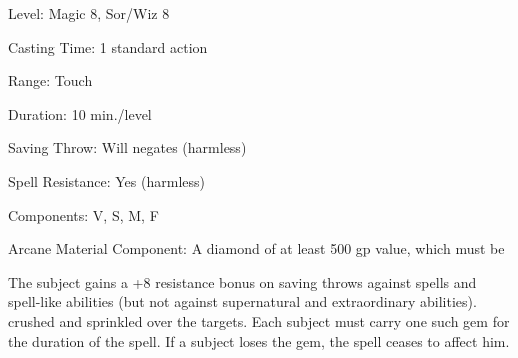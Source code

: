 
\begin{description*}
\item[Level:] Magic 8, Sor/Wiz 8
\item[Casting Time:] 1 standard action
\item[Range:] Touch
\item[Duration:] 10 min./level
\item[Saving Throw:] Will negates (harmless)
\item[Spell Resistance:] Yes (harmless)
\item[Components:] V, S, M, F
\item[Arcane Material Component:] A diamond of at least 500 gp value, which must be
\end{description*}

The subject gains a +8 resistance bonus on saving throws against spells and spell-like
abilities (but not against supernatural and extraordinary abilities).
crushed and sprinkled over the targets.
Each subject must carry one such gem for the duration of the spell. If a subject
loses the gem, the spell ceases to affect him.